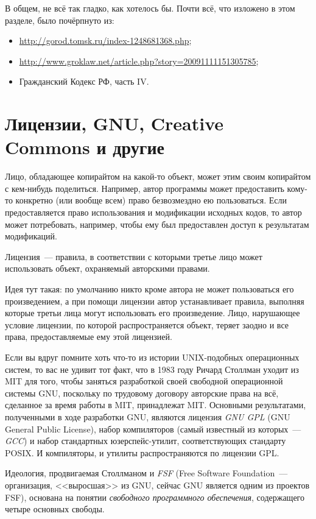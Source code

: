 В общем, не всё так гладко, как хотелось бы. Почти всё, что изложено в этом разделе, было почёрпнуто из:
\begin{itemize}
    \item \url{http://gorod.tomsk.ru/index-1248681368.php};
    \item \url{http://www.groklaw.net/article.php?story=20091111151305785};
    \item Гражданский Кодекс РФ, часть IV.
\end{itemize}

\section{Лицензии, GNU, Creative Commons и другие}

Лицо, обладающее копирайтом на какой-то объект, может этим своим копирайтом с кем-нибудь поделиться.
Например, автор программы может предоставить кому-то конкретно (или вообще всем) право безвозмездно ею пользоваться.
Если предоставляется право использования и модификации исходных кодов, то автор может потребовать, например, чтобы ему был предоставлен доступ к результатам модификаций.

\begin{definition}
Лицензия~--- правила, в соответствии с которыми третье лицо может использовать объект, охраняемый авторскими правами.
\end{definition}

Идея тут такая: по умолчанию никто кроме автора не может пользоваться его произведением, а при помощи лицензии автор устанавливает правила, выполняя которые третьи лица могут использовать его произведение.
Лицо, нарушающее условие лицензии, по которой распространяется объект, теряет заодно и все права, предоставляемые ему этой лицензией.

Если вы вдруг помните хоть что-то из истории UNIX-подобных операционных систем, то вас не удивит тот факт, что в 1983 году Ричард Столлман уходит из MIT для того, чтобы заняться разработкой своей свободной операционной системы GNU, поскольку по трудовому договору авторские права на всё, сделанное за время работы в MIT, принадлежат MIT.
Основными результатами, полученными в ходе разработки GNU, являются лицензия \emph{GNU GPL} (GNU General Public License), набор компиляторов (самый известный из которых~--- \emph{GCC}) и набор стандартных юзерспейс-утилит, соответствующих стандарту POSIX.
И компиляторы, и утилиты распространяются по лицензии GPL.

Идеология, продвигаемая Столлманом и \emph{FSF} (Free Software Foundation~--- организация, <<выросшая>> из GNU, сейчас GNU является одним из проектов FSF), основана на понятии \emph{свободного программного обеспечения}, содержащего четыре основных свободы.

